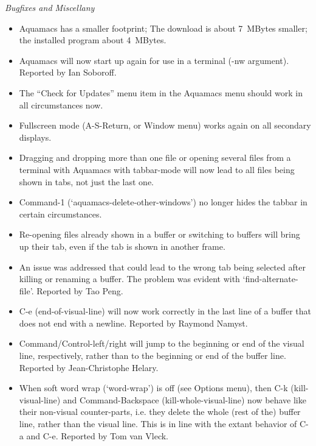 \emph{Bugfixes and Miscellany}

\begin{itemize}

\item Aquamacs has a smaller footprint; The download is about 7~MBytes smaller; the installed program about 4~MBytes.

\item Aquamacs will now start up again for use in a terminal (-nw argument).
Reported by Ian Soboroff.

\item The ``Check for Updates'' menu item in the Aquamacs menu should work in all circumstances now.

\item Fullscreen mode (A-S-Return, or Window menu) works again on all secondary displays.

\item Dragging and dropping more than one file or opening several files from a terminal with Aquamacs with tabbar-mode will now lead to all files being shown in tabs, not just the last one.

\item Command-1 (`aquamacs-delete-other-windows') no longer hides the tabbar in certain circumstances.  

\item Re-opening files already shown in a buffer or switching to buffers will bring up their tab, even if the tab is shown in another frame.

\item An issue was addressed that could lead to the wrong tab being selected after killing or renaming a buffer.  The problem was evident with `find-alternate-file'.
Reported by Tao Peng.

\item C-e (end-of-visual-line) will now work correctly in the last line of a buffer that does not end with a newline.
  Reported by Raymond Namyst.

\item Command/Control-left/right will jump to the beginning or end of the visual line, respectively, rather than to the beginning or end of the buffer line.
Reported by Jean-Christophe Helary.

\item When soft word wrap (`word-wrap') is off (see Options menu), then C-k (kill-visual-line) and Command-Backspace (kill-whole-visual-line) now behave like their non-visual counter-parts, i.e. they delete the whole (rest of the) buffer line, rather than the visual line.  This is in line with the extant behavior of C-a and C-e.
Reported by Tom van Vleck.


\end{itemize}
